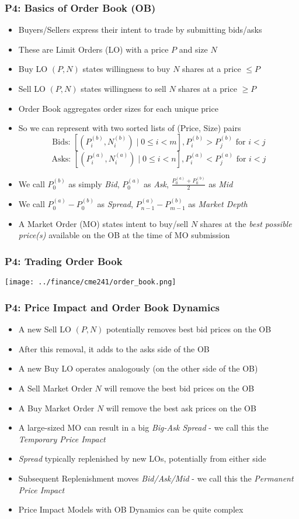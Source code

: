 \documentclass[handout]{beamer}
\begin{document}
\begin{frame}
\frametitle{P4: Basics of Order Book (OB)}
\pause
\begin{itemize}[<+->]
\item Buyers/Sellers express their intent to trade by submitting bids/asks
\item These are Limit Orders (LO) with a price $P$ and size $N$
\item Buy LO $(P, N)$ states willingness to buy $N$ shares at a price $\leq P$
\item Sell  LO $(P, N)$ states willingness to sell $N$ shares at a price $\geq P$
\item Order Book aggregates order sizes for each unique price
\item So we can represent with two sorted lists of (Price, Size) pairs
$$\mbox{Bids: } [(P_i^{(b)}, N_i^{(b)}) \mid 0 \leq i < m], P_i^{(b)} > P_j^{(b)} \mbox{ for } i < j$$
$$\mbox{Asks: } [(P_i^{(a)}, N_i^{(a)}) \mid 0 \leq i < n], P_i^{(a)} < P_j^{(a)} \mbox{ for } i < j$$
\item We call $P_0^{(b)}$ as simply {\em Bid}, $P_0^{(a)}$ as {\em Ask}, $\frac {P_0^{(a)} + P_0^{(b)}} 2$ as {\em Mid}
\item We call $P_0^{(a)} - P_0^{(b)}$ as {\em Spread}, $P_{n-1}^{(a)} - P_{m-1}^{(b)}$ as {\em Market Depth}
\item A Market Order (MO) states intent to buy/sell $N$ shares at the {\em best possible price(s)} available on the OB at the time of MO submission
\end{itemize}
\end{frame}

\begin{frame}
\frametitle{P4: Trading Order Book}
\texttt{[image: ../finance/cme241/order\_book.png]}
\end{frame}

\begin{frame}
\frametitle{P4: Price Impact and Order Book Dynamics}
\pause
\begin{itemize}[<+->]
\item A new Sell LO $(P,N)$ potentially removes best bid prices on the OB
\item After this removal, it adds to the asks side of the OB 
\item A new Buy LO operates analogously (on the other side of the OB)
\item A Sell Market Order $N$ will remove the best bid prices on the OB
\item A Buy Market Order $N$ will remove the best ask prices on the OB
\item A large-sized MO can result in a big {\em Big-Ask Spread} - we call this the {\em Temporary Price Impact}
\item {\em Spread} typically replenished by new LOs, potentially from either side
\item Subsequent Replenishment moves {\em Bid/Ask/Mid} - we call this the {\em Permanent Price Impact}
\item Price Impact Models with OB Dynamics can be quite complex
\end{itemize}
\end{frame}
\end{document}
